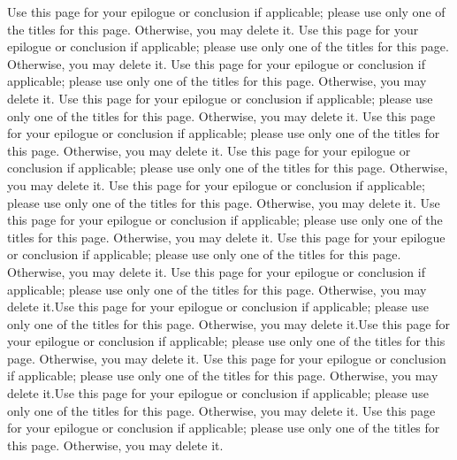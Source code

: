 \begin{flushleft}
Use this page for your epilogue or conclusion if applicable; please use only one of the titles for this page. Otherwise, you may delete it.
Use this page for your epilogue or conclusion if applicable; please use only one of the titles for this page. Otherwise, you may delete it.
Use this page for your epilogue or conclusion if applicable; please use only one of the titles for this page. Otherwise, you may delete it.
Use this page for your epilogue or conclusion if applicable; please use only one of the titles for this page. Otherwise, you may delete it.
Use this page for your epilogue or conclusion if applicable; please use only one of the titles for this page. Otherwise, you may delete it.
Use this page for your epilogue or conclusion if applicable; please use only one of the titles for this page. Otherwise, you may delete it.
Use this page for your epilogue or conclusion if applicable; please use only one of the titles for this page. Otherwise, you may delete it.
Use this page for your epilogue or conclusion if applicable; please use only one of the titles for this page. Otherwise, you may delete it.
Use this page for your epilogue or conclusion if applicable; please use only one of the titles for this page. Otherwise, you may delete it.
Use this page for your epilogue or conclusion if applicable; please use only one of the titles for this page. Otherwise, you may delete it.Use this page for your epilogue or conclusion if applicable; please use only one of the titles for this page. Otherwise, you may delete it.Use this page for your epilogue or conclusion if applicable; please use only one of the titles for this page. Otherwise, you may delete it.
Use this page for your epilogue or conclusion if applicable; please use only one of the titles for this page. Otherwise, you may delete it.Use this page for your epilogue or conclusion if applicable; please use only one of the titles for this page. Otherwise, you may delete it.
Use this page for your epilogue or conclusion if applicable; please use only one of the titles for this page. Otherwise, you may delete it.
\end{flushleft}




